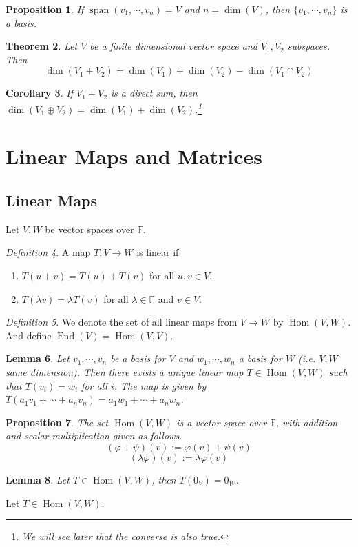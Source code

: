 \documentclass[12pt]{amsart}
\newcommand{\fff}[0]{\mathbb{F}}
\DeclareMathOperator{\s}{span}
\DeclareMathOperator{\Hom}{Hom}
\DeclareMathOperator{\End}{End}
\newtheorem{theorem}{Theorem}[section]
\newtheorem{lemma}[theorem]{Lemma}
\newtheorem{proposition}[theorem]{Proposition}
\newtheorem{corollary}[theorem]{Corollary}
\theoremstyle{remark}
\newtheorem{definition}[theorem]{Definition}
\numberwithin{equation}{section}
\begin{document}
\begin{proposition}
	If $\s(v_1,\cdots,v_n)=V$ and $n=\dim(V)$, then $\{v_1,\cdots,v_n\}$ is a basis.
\end{proposition}
\begin{theorem}
	Let $V$ be a finite dimensional vector space and $V_1,V_2$ subspaces. Then
	\[\dim(V_1+V_2)=\dim(V_1)+\dim(V_2)-\dim(V_1\cap V_2)\]
\end{theorem}
\begin{corollary}
	If $V_1+V_2$ is a direct sum, then $\dim(V_1\oplus V_2)=\dim(V_1)+\dim(V_2)$.\footnote{We will see later that the converse is also true.}
\end{corollary}

\section{Linear Maps and Matrices}
\subsection{Linear Maps}
Let $V,W$ be vector spaces over $\fff$.

\begin{definition}
	A map $T:V\to W$ is linear if
	\begin{enumerate}
		\item $T(u+v)=T(u)+T(v)$ for all $u,v\in V$.
		\item $T(\lambda v)=\lambda T(v)$ for all $\lambda\in\fff$ and $v\in V$.
	\end{enumerate}
\end{definition}
\begin{definition}
	We denote the set of all linear maps from $V\to W$ by $\Hom(V,W)$. And define $\End(V)=\Hom(V,V)$. \end{definition}
	\begin{lemma}
		Let $v_1,\cdots,v_n$ be a basis for $V$ and $w_1,\cdots,w_n$ a basis for $W$ (i.e. $V,W$ same dimension). Then there exists a unique linear map $T\in\Hom(V,W)$ such that $T(v_i)=w_i$ for all $i$. The map is given by $T(a_1 v_1+\cdots+a_n v_n)=a_1w_1+\cdots+a_nw_n$.
	\end{lemma}
	\begin{proposition}
		The set $\Hom(V,W)$ is a vector space over $\fff$, with addition and scalar multiplication given as follows.
		\[(\varphi+\psi)(v):=\varphi(v)+\psi(v)\]
		\[(\lambda \varphi)(v):=\lambda \varphi(v)\]
	\end{proposition}
	\begin{lemma}
		Let $T\in\Hom(V,W)$, then $T(0_V)=0_W$.
	\end{lemma}
	Let $T\in\Hom(V,W)$.
	
\end{document}
